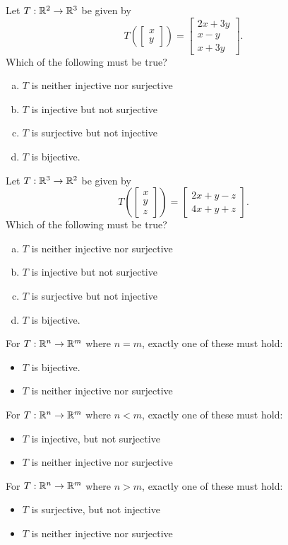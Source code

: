 \begin{applicationActivities}
\begin{activity}{3}
Let $T: \mathbb{R}^2 \rightarrow \mathbb{R}^3$ be given by $$T\left(\begin{bmatrix} x \\ y \end{bmatrix} \right) = \begin{bmatrix} 2x+3y \\ x-y \\ x+3y\end{bmatrix}.$$  Which of the following must be true?
\begin{enumerate}[(a)]
\item $T$ is neither injective nor surjective
\item $T$ is injective but not surjective
\item $T$ is surjective but not injective
\item $T$ is bijective.
\end{enumerate}
\end{activity}

\begin{activity}{3}
Let $T: \mathbb{R}^3 \rightarrow \mathbb{R}^2$ be given by $$T\left(\begin{bmatrix} x \\ y  \\ z \end{bmatrix} \right) = \begin{bmatrix} 2x+y-z \\ 4x+y+z\end{bmatrix}.$$  Which of the following must be true?
\begin{enumerate}[(a)]
\item $T$ is neither injective nor surjective
\item $T$ is injective but not surjective
\item $T$ is surjective but not injective
\item $T$ is bijective.
\end{enumerate}
\end{activity}

\begin{observation}
For \(T:\mathbb{R}^n\to\mathbb{R}^m\) where \(n=m\), exactly one of these must hold:
\begin{itemize}
\item $T$ is bijective.
\item $T$ is neither injective nor surjective
\end{itemize}
For \(T:\mathbb{R}^n\to\mathbb{R}^m\) where \(n<m\), exactly one of these must hold:
\begin{itemize}
\item $T$ is injective, but not surjective
\item $T$ is neither injective nor surjective
\end{itemize}
For \(T:\mathbb{R}^n\to\mathbb{R}^m\) where \(n>m\), exactly one of these must hold:
\begin{itemize}
\item $T$ is surjective, but not injective
\item $T$ is neither injective nor surjective
\end{itemize}
\end{observation}

\end{applicationActivities}
